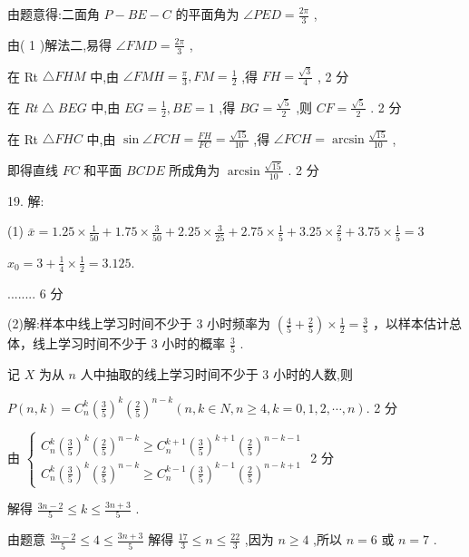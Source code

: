 \documentclass[10pt]{article}
\begin{document}
由题意得:二面角 \(P - {BE} - C\) 的平面角为 \(\angle {PED} = \frac{2\pi }{3}\) ,

由( 1 )解法二,易得 \(\angle {FMD} = \frac{2\pi }{3}\) ,

在 Rt \(\bigtriangleup {FHM}\) 中,由 \(\angle {FMH} = \frac{\pi }{3},{FM} = \frac{1}{2}\) ,得 \({FH} = \frac{\sqrt{3}}{4}\) , 2 分

在 \({Rt}\bigtriangleup {BEG}\) 中,由 \({EG} = \frac{1}{2},{BE} = 1\) ,得 \({BG} = \frac{\sqrt{5}}{2}\) ,则 \({CF} = \frac{\sqrt{5}}{2}\) . 2 分

在 Rt \(\bigtriangleup {FHC}\) 中,由 \(\sin \angle {FCH} = \frac{FH}{FC} = \frac{\sqrt{15}}{10}\) ,得 \(\angle {FCH} = \arcsin \frac{\sqrt{15}}{10}\) ,

即得直线 \({FC}\) 和平面 \({BCDE}\) 所成角为 \(\arcsin \frac{\sqrt{15}}{10}\) . 2 分

19. 解:

(1) \(\bar{x} = {1.25} \times  \frac{1}{50} + {1.75} \times  \frac{3}{50} + {2.25} \times  \frac{3}{25} + {2.75} \times  \frac{1}{5} + {3.25} \times  \frac{2}{5} + {3.75} \times  \frac{1}{5} = 3\)

\({x}_{0} = 3 + \frac{1}{4} \times  \frac{1}{2} = {3.125}.\)

........ 6 分

(2)解:样本中线上学习时间不少于 3 小时频率为 \(\left( {\frac{4}{5} + \frac{2}{5}}\right)  \times  \frac{1}{2} = \frac{3}{5}\) ，以样本估计总体，线上学习时间不少于 3 小时的概率 \(\frac{3}{5}\) .

记 \(X\) 为从 \(n\) 人中抽取的线上学习时间不少于 3 小时的人数,则

\(P\left( {n,k}\right)  = {C}_{n}^{k}{\left( \frac{3}{5}\right) }^{k}{\left( \frac{2}{5}\right) }^{n - k}\left( {n,k \in  N,n \geq  4,k = 0,1,2,\cdots ,n}\right) .\) 2 分

由 \(\left\{  \begin{array}{l} {C}_{n}^{k}{\left( \frac{3}{5}\right) }^{k}{\left( \frac{2}{5}\right) }^{n - k} \geq  {C}_{n}^{k + 1}{\left( \frac{3}{5}\right) }^{k + 1}{\left( \frac{2}{5}\right) }^{n - k - 1} \\  {C}_{n}^{k}{\left( \frac{3}{5}\right) }^{k}{\left( \frac{2}{5}\right) }^{n - k} \geq  {C}_{n}^{k - 1}{\left( \frac{3}{5}\right) }^{k - 1}{\left( \frac{2}{5}\right) }^{n - k + 1} \end{array}\right.\) 2 分

解得 \(\frac{{3n} - 2}{5} \leq  k \leq  \frac{{3n} + 3}{5}\) .

由题意 \(\frac{{3n} - 2}{5} \leq  4 \leq  \frac{{3n} + 3}{5}\) 解得 \(\frac{17}{3} \leq  n \leq  \frac{22}{3}\) ,因为 \(n \geq  4\) ,所以 \(n = 6\) 或 \(n = 7\) .
\end{document}
